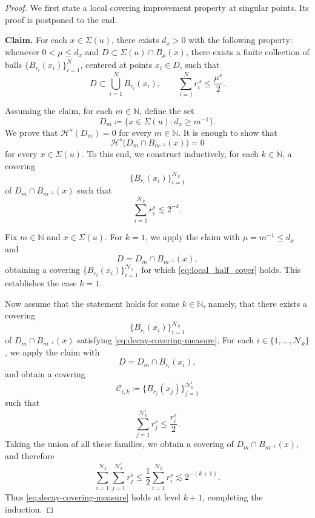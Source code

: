 \documentclass[reqno,11pt]{amsart}
\newcommand{\1}{\mathds{1}}  %
\numberwithin{equation}{section}
\begin{document}
\begin{proof}
We first state a local covering improvement property at singular points. Its proof is postponed to the end.

\medskip
\noindent\textbf{Claim.} For each \(x \in \Sigma(u)\), there exists \(d_x > 0\) with the following property: whenever \(0 < \mu \le d_x\) and \(D \subset \Sigma(u) \cap B_\mu(x)\), there exists a finite collection of balls \(\{B_{r_i}(x_i)\}_{i=1}^N\), centered at points \(x_i \in D\), such that
\begin{equation}\label{eq:local_half_cover}
D\subset \bigcup_{i=1}^{N} B_{r_i}(x_i),
\qquad
\sum_{i=1}^{N} r_i^{\,s}\le \frac{\mu^s}{2}.
\end{equation}

Assuming the claim, for each $m \in \mathbb{N}$, define the set
\[
	D_m \coloneqq \{x \in \Sigma(u) : d_x \ge m^{-1}\}.
\]
We prove that $\mathcal{H}^s(D_m) = 0$ for every $m \in \mathbb{N}$. It is enough to show that
\[
	\mathcal{H}^s\bigl(D_m \cap B_{m^{-1}}(x)\bigr) = 0
\]
for every $x \in \Sigma(u)$. To this end, we construct inductively, for each $k \in \mathbb{N}$, a covering
\[
	\{B_{r_i}(x_i)\}_{i=1}^{\mathcal{N}_k}
\]
of $D_m \cap B_{m^{-1}}(x)$ such that
\begin{equation}\label{eq:decay-covering-measure}
\sum_{i=1}^{\mathcal{N}_k} r_i^s \lesssim 2^{-k}.
\end{equation}

Fix $m \in \mathbb{N}$ and $x \in \Sigma(u)$. For $k=1$, we apply the claim with $\mu = m^{-1} \le d_x$ and
\[
	D = D_m \cap B_{m^{-1}}(x),
\]
obtaining a covering $\{B_{r_i}(x_i)\}_{i=1}^{\mathcal{N}_1}$ for which \eqref{eq:local_half_cover} holds. This establishes the case $k=1$.

Now assume that the statement holds for some $k \in \mathbb{N}$, namely, that there exists a covering
\[
	\{B_{r_i}(x_i)\}_{i=1}^{\mathcal{N}_k}
\]
of $D_m \cap B_{m^{-1}}(x)$ satisfying \eqref{eq:decay-covering-measure}. For each $i \in \{1,\dots,\mathcal{N}_k\}$, we apply the claim with
\[
	D = D_m \cap B_{r_i}(x_i),
\]
and obtain a covering
\[
	\mathcal{C}_{i,k} \coloneqq \{B_{r_j}(x_j)\}_{j=1}^{\mathcal{N}_k^i}
\]
such that
\[
	\sum_{j=1}^{\mathcal{N}_k^i} r_j^s \le \frac{r_i^s}{2}.
\]
Taking the union of all these families, we obtain a covering of $D_m \cap B_{m^{-1}}(x)$, and therefore
\[
	\sum_{i=1}^{\mathcal{N}_k} \sum_{j=1}^{\mathcal{N}_k^i} r_j^s
	\le \frac{1}{2} \sum_{i=1}^{\mathcal{N}_k} r_i^s
	\lesssim 2^{-(k+1)}.
\]
Thus \eqref{eq:decay-covering-measure} holds at level $k+1$, completing the induction.


\end{proof}
\end{document}
